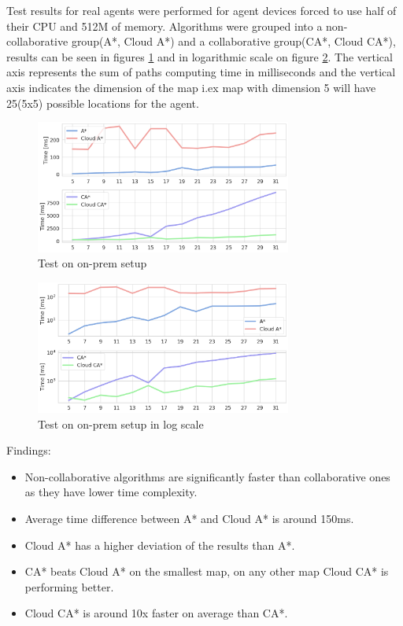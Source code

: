 Test results for real agents were performed for agent devices forced to use half of their CPU and 512M of memory. Algorithms were grouped into a non-collaborative group(A*, Cloud A*) and a collaborative group(CA*, Cloud CA*), results can be seen in figures \ref{fig:on_prem_test_time} and in logarithmic scale on figure \ref{fig:on_prem_test_time_log}. The vertical axis represents the sum of paths computing time in milliseconds and the vertical axis indicates the dimension of the map i.ex map with dimension 5 will have 25(5x5) possible locations for the agent.

\begin{figure}
    \centering
    \includegraphics[width=0.75\textwidth]{pictures/on_prem_test_time.png}
    \caption{Test on on-prem setup}
    \label{fig:on_prem_test_time}
\end{figure}
\begin{figure}
    \centering
    \includegraphics[width=0.75\textwidth]{pictures/on_prem_test_time_log.png}
    \caption{Test on on-prem setup in log scale}
    \label{fig:on_prem_test_time_log}
\end{figure}

Findings:
\begin{itemize}
    \item Non-collaborative algorithms are significantly faster than collaborative ones as they have lower time complexity. 
    \item Average time difference between A* and Cloud A* is around 150ms.
    \item Cloud A* has a higher deviation of the results than A*.
    \item CA* beats Cloud A* on the smallest map, on any other map Cloud CA* is performing better.
    \item Cloud CA* is around 10x faster on average than CA*.
\end{itemize}